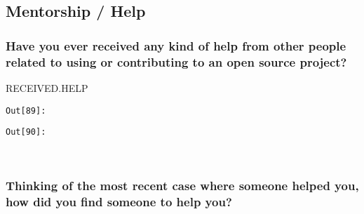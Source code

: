 \documentclass[11pt]{article}
\begin{document}
    \subsection{Mentorship / Help}\label{mentorship-help}

    \subsubsection{Have you ever received any kind of help from other people
related to using or contributing to an open source
project?}\label{have-you-ever-received-any-kind-of-help-from-other-people-related-to-using-or-contributing-to-an-open-source-project}

RECEIVED.HELP

\texttt{\color{outcolor}Out[{\color{outcolor}89}]:}
    

    

\texttt{\color{outcolor}Out[{\color{outcolor}90}]:}
    

    


    \begin{center}
    \end{center}
    { \hspace*{\fill} \\}
    
    \subsubsection{Thinking of the most recent case where someone helped
you, how did you find someone to help
you?}\label{thinking-of-the-most-recent-case-where-someone-helped-you-how-did-you-find-someone-to-help-you}
\end{document}
